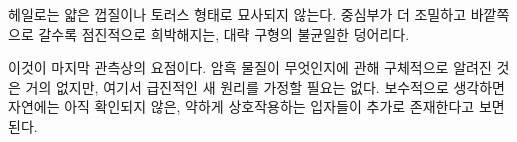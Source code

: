 헤일로는 얇은 껍질이나 토러스 형태로 묘사되지 않는다. 중심부가 더 조밀하고 바깥쪽으로 갈수록 점진적으로 희박해지는, 대략 구형의 불균일한 덩어리다.

\begin{classroomqa}
\end{classroomqa}

이것이 마지막 관측상의 요점이다. 암흑 물질이 무엇인지에 관해 구체적으로 알려진 것은 거의 없지만, 여기서 급진적인 새 원리를 가정할 필요는 없다. 보수적으로 생각하면 자연에는 아직 확인되지 않은, 약하게 상호작용하는 입자들이 추가로 존재한다고 보면 된다.
